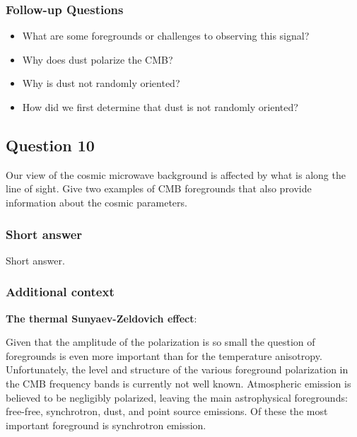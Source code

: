 \documentclass[a4paper,11pt]{article}
\begin{document}
\subsubsection{Follow-up Questions}

\begin{itemize}
    \item What are some foregrounds or challenges to observing this signal?
    \item Why does dust polarize the CMB?
    \item Why is dust not randomly oriented?
    \item How did we first determine that dust is not randomly oriented?
\end{itemize}

%
%

\newpage
\subsection{Question 10}

Our view of the cosmic microwave background is affected by what is along the line of sight. Give two examples of CMB foregrounds that also provide information about the cosmic parameters.

\subsubsection{Short answer}

Short answer.

\subsubsection{Additional context}

{\noindent}\textbf{The thermal Sunyaev-Zeldovich effect}: 

{\noindent}Given that the amplitude of the polarization is so small the question of foregrounds is even more important than for the temperature anisotropy. Unfortunately, the level and structure of the various foreground polarization in the CMB frequency bands is currently not well known. Atmospheric emission is believed to be negligibly polarized, leaving the main astrophysical foregrounds: free-free, synchrotron, dust, and point source emissions. Of these the most important foreground is synchrotron emission.
\end{document}
